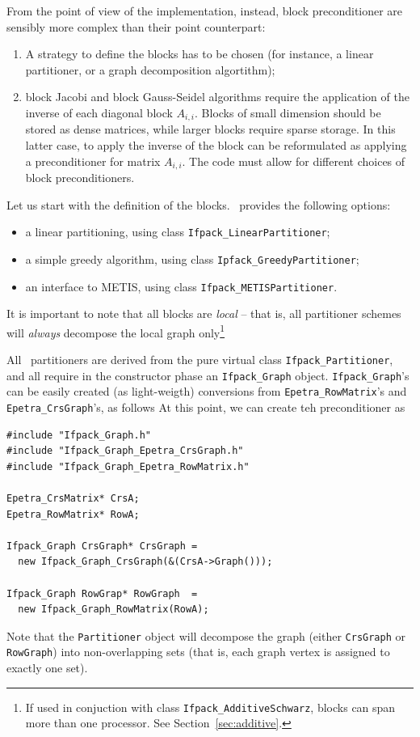From the point of view of the implementation, instead, block preconditioner
are sensibly more complex than their point counterpart:
\begin{enumerate}
\item A strategy to define the blocks has to be chosen (for instance, 
a linear partitioner, or a graph decomposition algortithm);
\item block Jacobi and block Gauss-Seidel algorithms require the application
of the inverse of each diagonal block $A_{i,i}$. Blocks of small dimension
should be stored as dense matrices, while larger blocks require sparse
storage. In this latter case, to apply the inverse of the block can be
reformulated as applying a preconditioner for matrix
$A_{i,i}$.
The code must allow for different choices of block preconditioners.
\end{enumerate}

\smallskip

Let us start with the definition of the blocks. 
\ifpack\ provides the following options:
\begin{itemize}
\item a linear partitioning, using class \verb!Ifpack_LinearPartitioner!;
\item a simple greedy algorithm, using class \verb!Ipfack_GreedyPartitioner!;
\item an interface to METIS, using class \verb!Ifpack_METISPartitioner!.
\end{itemize}
It is important to note that all blocks are {\sl local} -- that is, 
  all partitioner schemes will {\sl always} decompose the local graph 
  only\footnote{If used in conjuction with class {\tt Ifpack\_AdditiveSchwarz},
    blocks can span more than one processor. See
      Section~\ref{sec:additive}.}

All \ifpack\ partitioners are derived from the pure virtual class
\verb!Ifpack_Partitioner!, and all require in the constructor phase
an \verb!Ifpack_Graph! object. \verb!Ifpack_Graph!'s can be easily
created (as light-weigth) conversions from \verb!Epetra_RowMatrix!'s
and \verb!Epetra_CrsGraph!'s, as follows At this point, we can create teh
preconditioner as
\begin{verbatim}
#include "Ifpack_Graph.h"
#include "Ifpack_Graph_Epetra_CrsGraph.h"
#include "Ifpack_Graph_Epetra_RowMatrix.h"

Epetra_CrsMatrix* CrsA;
Epetra_RowMatrix* RowA;

Ifpack_Graph CrsGraph* CrsGraph =
  new Ifpack_Graph_CrsGraph(&(CrsA->Graph()));

Ifpack_Graph RowGrap* RowGraph  =
  new Ifpack_Graph_RowMatrix(RowA);
\end{verbatim}
Note that the \verb!Partitioner! object will decompose the graph (either
\verb!CrsGraph! or \verb!RowGraph!) into
non-overlapping sets (that is, each graph vertex is assigned to exactly one
set).

